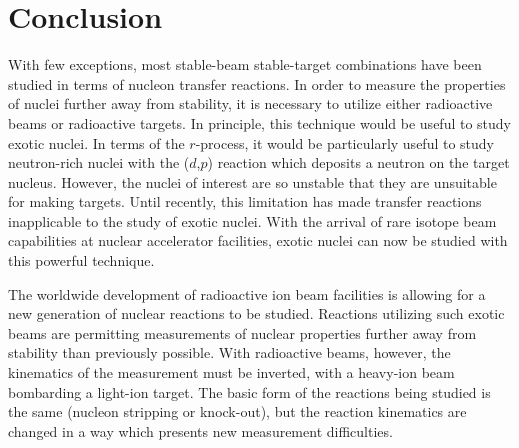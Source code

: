 \section{Conclusion}
With few exceptions, most stable-beam stable-target combinations have been studied in terms of nucleon transfer reactions.  In order to measure the properties of nuclei further away from stability, it is necessary to utilize either radioactive beams or radioactive targets.  In principle, this technique would be useful to study exotic nuclei.  In terms of the $r$-process, it would be particularly useful to study neutron-rich nuclei with the ($d$,$p$) reaction which deposits a neutron on the target nucleus.  However, the nuclei of interest are so unstable that they are unsuitable for making targets.  Until recently, this limitation has made transfer reactions inapplicable to the study of exotic nuclei.  With the arrival of rare isotope beam capabilities at nuclear accelerator facilities, exotic nuclei can now be studied with this powerful technique.

The worldwide development of radioactive ion beam facilities is allowing for a new generation of nuclear reactions to be studied.  Reactions utilizing such exotic beams are permitting measurements of nuclear properties further away from stability than previously possible.  With radioactive beams, however, the kinematics of the measurement must be inverted, with a heavy-ion beam bombarding a light-ion target.  The basic form of the reactions being studied is the same (nucleon stripping or knock-out), but the reaction kinematics are changed in a way which presents new measurement difficulties.

%
%
%
